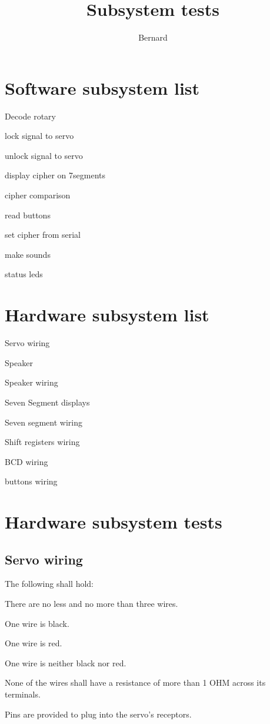 \documentclass{report}
\title{Subsystem tests}
\author{Bernard}
\begin{document}
\chapter{Software subsystem list}
\begin{description}
\item Decode rotary
\item lock signal to servo
\item unlock signal to servo
\item display cipher on 7segments
\item cipher comparison
\item read buttons
\item set cipher from serial
\item make sounds
\item status leds
\end{description}

\chapter{Hardware subsystem list}
\begin{description}
\item Servo wiring
\item Speaker
\item Speaker wiring
\item Seven Segment displays
\item Seven segment wiring
\item Shift registers wiring
\item BCD wiring
\item buttons wiring
\end{description}

\chapter{Hardware subsystem tests}
\section{Servo wiring}
The following shall hold:
\begin{description}
\item There are no less and no more than three wires.
\item One wire is black.
\item One wire is red.
\item One wire is neither black nor red.
\item None of the wires shall have a resistance of more than 1 OHM across its terminals.
\item Pins are provided to plug into the servo's receptors.
\end{description}
\end{document}
